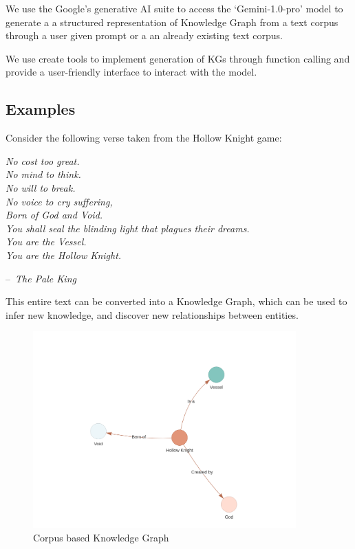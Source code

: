 We use the Google's generative AI suite to access the `Gemini-1.0-pro' model to generate a
a structured representation of Knowledge Graph from a text corpus through a user given prompt or a
an already existing text corpus.

We use create tools to implement generation of KGs through function calling and
provide a user-friendly interface to interact with the model.


\subsection*{Examples}

Consider the following verse taken from the Hollow Knight game:\vspace*{1em}

\makeatletter
\renewcommand{\@chapapp}{}%
\newenvironment{chapquote}[2][2em]
{\setlength{\@tempdima}{#1}%
    \def\chapquote@author{#2}%
    \parshape 1 \@tempdima \dimexpr\textwidth-2\@tempdima\relax%
    \itshape}
{\par\normalfont\hfill--\ \chapquote@author\hspace*{\@tempdima}\par\bigskip}
\makeatother

\begin{chapquote}{\textit{The Pale King}}
    \noindent No cost too great.\\
    No mind to think.\\
    No will to break.\\
    No voice to cry suffering, \\[1em]
    Born of God and Void.\\
    You shall seal the blinding light that plagues their dreams.\\
    You are the Vessel.\\
    You are the Hollow Knight.
\end{chapquote}

This entire text can be converted into a Knowledge Graph, which can be used to
infer new knowledge, and discover new relationships between entities.

\pagebreak
\begin{figure}[h!]
    \centering
    \includegraphics[width=0.9\textwidth]{images/hknobg.png}
    \caption{Corpus based Knowledge Graph}
    \label{fig:hk}
\end{figure}


